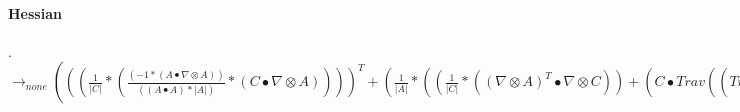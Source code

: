 \documentclass{article}
\begin{document}
\paragraph{Hessian}.
 \\ \newline $\rightarrow_{none}
((( \frac{1}{|C|}*( \frac{(-1*(A \bullet  \nabla  \otimes A))}{((A \bullet A)*|A|)}*(C \bullet  \nabla  \otimes A))))^T+( \frac{1}{|A|}*(( \frac{1}{|C|}*(( \nabla  \otimes A)^T \bullet  \nabla  \otimes C))+(C \bullet Trav((Trav((( \nabla  \otimes A* \frac{(-1*(C \bullet  \nabla  \otimes C))}{((C \bullet C)*|C|)})))<1,2,0>+Trav(( \frac{1}{|C|}* \nabla  \otimes  \nabla  \otimes A))<1,2,0>))<1,2,0>)))+(((((C* \frac{(-1*(A \bullet  \nabla  \otimes A))}{(|C|*|A|*(A \bullet A))})))^T+( \frac{1}{|A|}*((( \frac{1}{|C|}* \nabla  \otimes C))^T+(((C* \frac{(-1*(C \bullet  \nabla  \otimes C))}{((C \bullet C)*|C|)})))^T))) \bullet  \nabla  \otimes A)+(A \bullet Trav((Trav((( \frac{(-1*(A \bullet  \nabla  \otimes A))}{(|C|*|A|*(A \bullet A))}* \nabla  \otimes C)))<:,2,1>+Trav(((C* \frac{((-1*|C|*|A|*(A \bullet A)*((( \nabla  \otimes A)^T \bullet  \nabla  \otimes A)+(A \bullet  \nabla  \otimes  \nabla  \otimes A)))-(-1*((A \bullet  \nabla  \otimes A) \otimes (((A \bullet A)*|C|* \frac{(A \bullet  \nabla  \otimes A)}{|A|})+(|A|*(((A \bullet A)* \frac{(C \bullet  \nabla  \otimes C)}{|C|})+(|C|*2*(A \bullet  \nabla  \otimes A))))))))}{(|C|*|A|*|A|*(A \bullet A)*(A \bullet A)*|C|)})))<1,2,0>+Trav(((((( \frac{1}{|C|}* \nabla  \otimes C))^T+(((C* \frac{(-1*(C \bullet  \nabla  \otimes C))}{((C \bullet C)*|C|)})))^T)* \frac{(-1*(A \bullet  \nabla  \otimes A))}{((A \bullet A)*|A|)})))<:,2,1>+( \frac{1}{|A|}*(Trav((( \nabla  \otimes C* \frac{(-1*(C \bullet  \nabla  \otimes C))}{((C \bullet C)*|C|)})))<1,2,0>+Trav(( \frac{1}{|C|}* \nabla  \otimes  \nabla  \otimes C))<1,2,0>+Trav((( \frac{(-1*(C \bullet  \nabla  \otimes C))}{((C \bullet C)*|C|)}* \nabla  \otimes C)))<:,2,1>+Trav(((C* \frac{((-1*(C \bullet C)*|C|*((( \nabla  \otimes C)^T \bullet  \nabla  \otimes C)+(C \bullet  \nabla  \otimes  \nabla  \otimes C)))-(-1*((C \bullet  \nabla  \otimes C) \otimes (((C \bullet C)* \frac{(C \bullet  \nabla  \otimes C)}{|C|})+(|C|*2*(C \bullet  \nabla  \otimes C))))))}{((C \bullet C)*|C|*(C \bullet C)*|C|)})))<1,2,0>))))<1,2,0>))$
\end{document}
